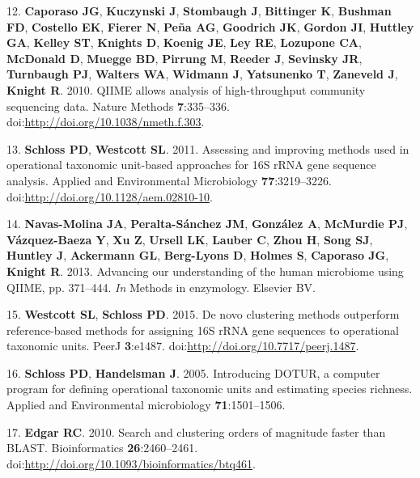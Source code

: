 \documentclass[11pt,]{article}
\begin{document}
12. \textbf{Caporaso JG}, \textbf{Kuczynski J}, \textbf{Stombaugh J},
\textbf{Bittinger K}, \textbf{Bushman FD}, \textbf{Costello EK},
\textbf{Fierer N}, \textbf{Peña AG}, \textbf{Goodrich JK},
\textbf{Gordon JI}, \textbf{Huttley GA}, \textbf{Kelley ST},
\textbf{Knights D}, \textbf{Koenig JE}, \textbf{Ley RE},
\textbf{Lozupone CA}, \textbf{McDonald D}, \textbf{Muegge BD},
\textbf{Pirrung M}, \textbf{Reeder J}, \textbf{Sevinsky JR},
\textbf{Turnbaugh PJ}, \textbf{Walters WA}, \textbf{Widmann J},
\textbf{Yatsunenko T}, \textbf{Zaneveld J}, \textbf{Knight R}. 2010.
QIIME allows analysis of high-throughput community sequencing data.
Nature Methods \textbf{7}:335--336.
doi:\url{http://doi.org/10.1038/nmeth.f.303}.

13. \textbf{Schloss PD}, \textbf{Westcott SL}. 2011. Assessing and
improving methods used in operational taxonomic unit-based approaches
for 16S rRNA gene sequence analysis. Applied and Environmental
Microbiology \textbf{77}:3219--3226.
doi:\url{http://doi.org/10.1128/aem.02810-10}.

14. \textbf{Navas-Molina JA}, \textbf{Peralta-Sánchez JM},
\textbf{González A}, \textbf{McMurdie PJ}, \textbf{Vázquez-Baeza Y},
\textbf{Xu Z}, \textbf{Ursell LK}, \textbf{Lauber C}, \textbf{Zhou H},
\textbf{Song SJ}, \textbf{Huntley J}, \textbf{Ackermann GL},
\textbf{Berg-Lyons D}, \textbf{Holmes S}, \textbf{Caporaso JG},
\textbf{Knight R}. 2013. Advancing our understanding of the human
microbiome using QIIME, pp. 371--444. \emph{In} Methods in enzymology.
Elsevier BV.

15. \textbf{Westcott SL}, \textbf{Schloss PD}. 2015. De novo clustering
methods outperform reference-based methods for assigning 16S rRNA gene
sequences to operational taxonomic units. PeerJ \textbf{3}:e1487.
doi:\url{http://doi.org/10.7717/peerj.1487}.

16. \textbf{Schloss PD}, \textbf{Handelsman J}. 2005. Introducing DOTUR,
a computer program for defining operational taxonomic units and
estimating species richness. Applied and Environmental microbiology
\textbf{71}:1501--1506.

17. \textbf{Edgar RC}. 2010. Search and clustering orders of magnitude
faster than BLAST. Bioinformatics \textbf{26}:2460--2461.
doi:\url{http://doi.org/10.1093/bioinformatics/btq461}.
\end{document}
